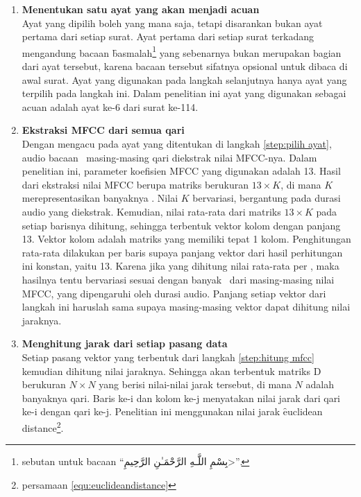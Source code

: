   \begin{enumerate}
    \item \label{step:pilih ayat} \textbf{Menentukan satu ayat yang akan menjadi acuan}\\
    Ayat yang dipilih boleh yang mana saja, tetapi disarankan bukan ayat pertama dari setiap surat. Ayat pertama dari setiap surat terkadang mengandung bacaan \f{basmalah}\footnote{sebutan untuk bacaan ``\<بِسْمِ اللَّـهِ الرَّحْمَـٰنِ الرَّحِيمِ>''.} yang sebenarnya bukan merupakan bagian dari ayat tersebut, karena bacaan tersebut sifatnya opsional untuk dibaca di awal surat. Ayat yang digunakan pada langkah selanjutnya hanya ayat yang terpilih pada langkah ini. Dalam penelitian ini ayat yang digunakan sebagai acuan adalah ayat ke-6 dari surat ke-114.
    
  	\item \label{step:hitung mfcc} \textbf{Ekstraksi MFCC dari semua qari}\\
  	Dengan mengacu pada ayat yang ditentukan di langkah \ref{step:pilih ayat}, audio bacaan \quran~masing-masing qari diekstrak nilai MFCC-nya. Dalam penelitian ini, parameter koefisien MFCC yang digunakan adalah 13. Hasil dari ekstraksi nilai MFCC berupa matriks berukuran $13\times K$, di mana $K$ merepresentasikan banyaknya \fr. Nilai $K$ bervariasi, bergantung pada durasi audio yang diekstrak. Kemudian, nilai rata-rata dari matriks $13\times K$ pada setiap barisnya dihitung, sehingga terbentuk vektor kolom dengan panjang 13. Vektor kolom adalah matriks yang memiliki tepat 1 kolom. Penghitungan rata-rata dilakukan per baris supaya panjang vektor dari hasil perhitungan ini konstan, yaitu 13. Karena jika yang dihitung nilai rata-rata per \fr, maka hasilnya tentu bervariasi sesuai dengan banyak \fr~dari masing-masing nilai MFCC, yang dipengaruhi oleh durasi audio. Panjang setiap vektor dari langkah ini haruslah sama supaya masing-masing vektor dapat dihitung nilai jaraknya.
  	
  	\item \label{step:hitung jarak} \textbf{Menghitung jarak dari setiap pasang data}\\
    Setiap pasang vektor yang terbentuk dari langkah \ref{step:hitung mfcc} kemudian dihitung nilai jaraknya. Sehingga akan terbentuk matriks D berukuran $N\times N$ yang berisi nilai-nilai jarak tersebut, di mana $N$ adalah banyaknya qari. Baris ke-i dan kolom ke-j menyatakan nilai jarak dari qari ke-i dengan qari ke-j. Penelitian ini menggunakan nilai jarak \f{euclidean distance}\footnote{persamaan \ref{equ:euclideandistance}}.
  	

\end{enumerate}
